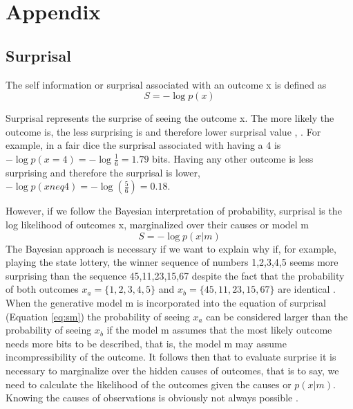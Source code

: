 \documentclass[11pt,twocolumn]{article}
\newcommand{\myreferences}{C:/Users/Jaime/Documents/GitHub/bibliography-jgr/bibliojgr}
\begin{document}
%


\section*{Appendix}
\label{se:ap}
\subsection{Surprisal}
The self information or surprisal associated with an outcome x is defined as 
\begin{equation}
S = -\log p(x)
\label{eq:s}
\end{equation}

Surprisal represents  the surprise of seeing the outcome x. The more likely the outcome is, the less surprising is and therefore lower surprisal value \cite{tribus_thermostatics_1961},  \cite{barto_novelty_2013}. For example, in a fair dice the surprisal associated with having a 4 is $-\log p(x =4) = -\log \frac{1}{6} =1.79$ bits. Having any other outcome is less surprising and therefore the surprisal is lower, $-\log p(x neq 4) = -\log (\frac{5}{6}) =0.18$.

However, if we follow the Bayesian interpretation of probability, surprisal is the log likelihood of outcomes x,  marginalized over their causes or model m
\begin{equation}
S = -\log p(x|m)
\label{eq:sm}
\end{equation}
The Bayesian approach is necessary if we want to explain why if, for example, playing the state lottery, the winner sequence of numbers 1,2,3,4,5 seems more surprising than the sequence 45,11,23,15,67 despite the fact that the probability of both outcomes $x_a=\{1,2,3,4,5\}$ and $x_b=\{45,11,23,15,67\}$ are identical \cite{palm_novelty_2012}. When the generative model m is incorporated into the equation of surprisal (Equation \ref{eq:sm}) the probability of seeing $x_a$ can be considered larger than  the probability of seeing $x_b$ if the model m assumes that the most likely outcome needs more bits to be described, that is, the model m may assume incompressibility of the outcome. It follows then that to evaluate surprise it is necessary to marginalize over the hidden causes of outcomes, that is to say, we need to calculate the likelihood of the outcomes given the causes or $p(x|m)$. Knowing the causes of observations is obviously not always possible \citep{gomez-ramirez_dont_2013}. 
\end{document}
